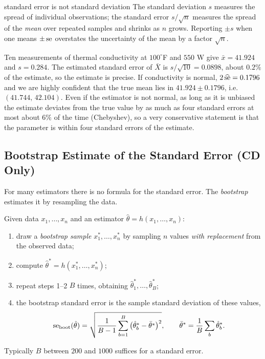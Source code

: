 \begin{pitfall}{standard error is not standard deviation}
The standard deviation $s$ measures the spread of individual observations; the standard error $s/\sqrt n$ measures the spread of the \emph{mean} over repeated samples and shrinks as $n$ grows. Reporting $\pm s$ when one means $\pm\operatorname{se}$ overstates the uncertainty of the mean by a factor $\sqrt n$.
\end{pitfall}

\begin{example}
Ten measurements of thermal conductivity at $100^\circ$F and $550$ W give $\bar{x}=41.924$ and $s=0.284$. The estimated standard error of $\bar{X}$ is $s/\sqrt{10}=0.0898$, about $0.2\%$ of the estimate, so the estimate is precise. If conductivity is normal, $2\,\widehat{\operatorname{se}}=0.1796$ and we are highly confident that the true mean lies in $41.924\pm0.1796$, i.e.\ $(41.744,\,42.104)$. Even if the estimator is not normal, as long as it is unbiased the estimate deviates from the true value by as much as four standard errors at most about $6\%$ of the time (Chebyshev), so a very conservative statement is that the parameter is within four standard errors of the estimate.
\end{example}

\subsection{Bootstrap Estimate of the Standard Error (CD Only)}

For many estimators there is no formula for the standard error. The \emph{bootstrap} estimates it by resampling the data.

\begin{definition}
Given data $x_1,\dots,x_n$ and an estimator $\hat\theta=h(x_1,\dots,x_n)$:
\begin{enumerate}[label=(\arabic*)]
  \item draw a \emph{bootstrap sample} $x_1^*,\dots,x_n^*$ by sampling $n$ values \emph{with replacement} from the observed data;
  \item compute $\hat\theta^*=h(x_1^*,\dots,x_n^*)$;
  \item repeat steps 1--2 $B$ times, obtaining $\hat\theta^*_1,\dots,\hat\theta^*_B$;
  \item the bootstrap standard error is the sample standard deviation of these values,
  \[ \operatorname{se}_{\mathrm{boot}}(\hat\theta)=\sqrt{\frac1{B-1}\sum_{b=1}^B\big(\hat\theta^*_b-\bar{\theta}^*\big)^2},\qquad\bar{\theta}^*=\frac1B\sum_b\hat\theta^*_b. \]
\end{enumerate}
Typically $B$ between $200$ and $1000$ suffices for a standard error.
\end{definition}


